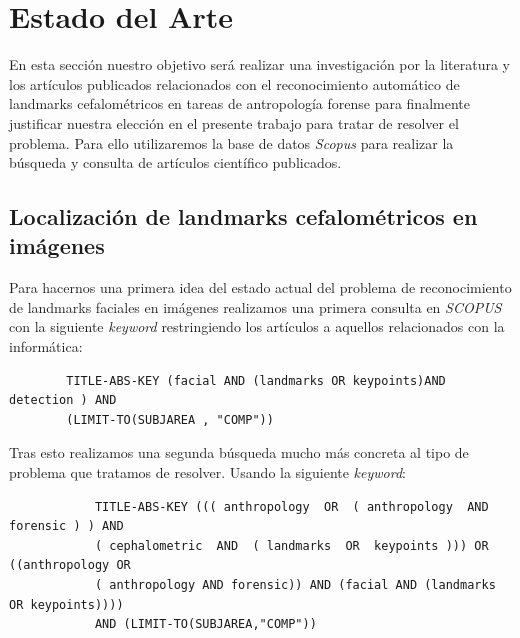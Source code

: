 
\chapter{Estado del Arte}

    \noindent En esta sección nuestro objetivo será realizar una investigación por la literatura y los artículos publicados relacionados con el reconocimiento automático de landmarks cefalométricos en tareas de antropología forense para finalmente justificar nuestra elección en el presente trabajo para tratar de resolver el problema. Para ello utilizaremos la base de datos \textit{Scopus} para realizar la búsqueda y consulta de artículos científico publicados.

    \section{Localización de landmarks cefalométricos en imágenes}

        \noindent Para hacernos una primera idea del estado actual del problema de reconocimiento de landmarks faciales en imágenes realizamos una primera consulta en \textit{SCOPUS} con la siguiente \textit{keyword} restringiendo los artículos a aquellos relacionados con la informática:
        
        \begin{verbatim}
        TITLE-ABS-KEY (facial AND (landmarks OR keypoints)AND  detection ) AND 
        (LIMIT-TO(SUBJAREA , "COMP"))
        \end{verbatim}

        \medskip

        \noindent Tras esto realizamos una segunda búsqueda mucho más concreta al tipo de problema que tratamos de resolver. Usando la siguiente \textit{keyword}:

        \begin{verbatim}
            TITLE-ABS-KEY ((( anthropology  OR  ( anthropology  AND  forensic ) ) AND  
            ( cephalometric  AND  ( landmarks  OR  keypoints ))) OR ((anthropology OR  
            ( anthropology AND forensic)) AND (facial AND (landmarks OR keypoints))))  
            AND (LIMIT-TO(SUBJAREA,"COMP"))
        \end{verbatim}

